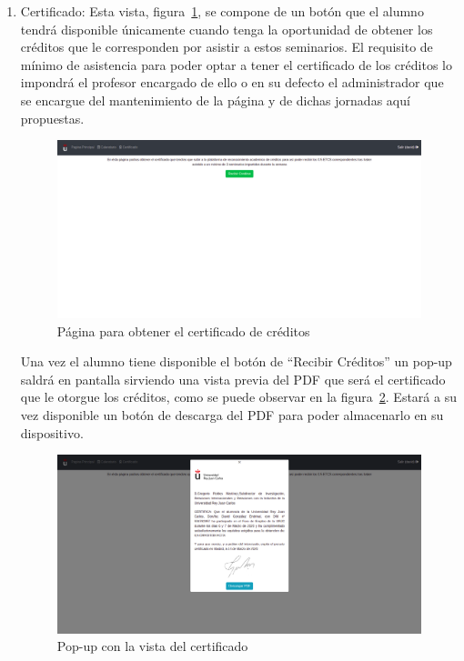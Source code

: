 \documentclass[a4paper, 12pt]{book}
\begin{document}
\begin{enumerate}
  \item Certificado: Esta vista, figura~\ref{fig:recibirCred}, se compone de un botón que el alumno tendrá disponible únicamente cuando tenga la oportunidad de obtener los créditos que le corresponden por asistir a estos seminarios. El requisito de mínimo de asistencia para poder optar a tener el certificado de los créditos lo impondrá el profesor encargado de ello o en su defecto el administrador que se encargue del mantenimiento de la página y de dichas jornadas aquí propuestas. 
  
    \begin{figure}[h!]
  	\centering
  	\includegraphics[width=16cm, keepaspectratio]{img/recibirCred.png}
  	\caption{Página para obtener el certificado de créditos}\label{fig:recibirCred}
	\end{figure}
  
  
  Una vez el alumno tiene disponible el botón de ``Recibir Créditos'' un pop-up saldrá en pantalla sirviendo una vista previa del PDF que será el certificado que le otorgue los créditos, como se puede observar en la figura~\ref{fig:pdfVisual}. Estará a su vez disponible un botón de descarga del PDF para poder almacenarlo en su dispositivo.
  
      \begin{figure}[h!]
  	\centering
  	\includegraphics[width=16cm, keepaspectratio]{img/pdfVisual.png}
  	\caption{Pop-up con la vista del certificado}\label{fig:pdfVisual}
	\end{figure}
  
\end{enumerate}
\end{document}
